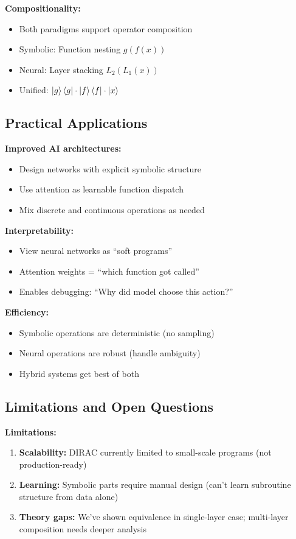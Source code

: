 \documentclass[11pt,a4paper]{article}
\theoremstyle{definition}
\begin{document}
\textbf{Compositionality:}
\begin{itemize}
\item Both paradigms support operator composition
\item Symbolic: Function nesting $g(f(x))$
\item Neural: Layer stacking $L_2(L_1(x))$
\item Unified: $\ket{g}\bra{g} \cdot \ket{f}\bra{f} \cdot \ket{x}$
\end{itemize}

\subsection{Practical Applications}

\textbf{Improved AI architectures:}
\begin{itemize}
\item Design networks with explicit symbolic structure
\item Use attention as learnable function dispatch
\item Mix discrete and continuous operations as needed
\end{itemize}

\textbf{Interpretability:}
\begin{itemize}
\item View neural networks as ``soft programs''
\item Attention weights = ``which function got called''
\item Enables debugging: ``Why did model choose this action?''
\end{itemize}

\textbf{Efficiency:}
\begin{itemize}
\item Symbolic operations are deterministic (no sampling)
\item Neural operations are robust (handle ambiguity)
\item Hybrid systems get best of both
\end{itemize}

\subsection{Limitations and Open Questions}

\textbf{Limitations:}

\begin{enumerate}
\item \textbf{Scalability:} DIRAC currently limited to small-scale programs (not production-ready)

\item \textbf{Learning:} Symbolic parts require manual design (can't learn subroutine structure from data alone)

\item \textbf{Theory gaps:} We've shown equivalence in single-layer case; multi-layer composition needs deeper analysis
\end{enumerate}
\end{document}
